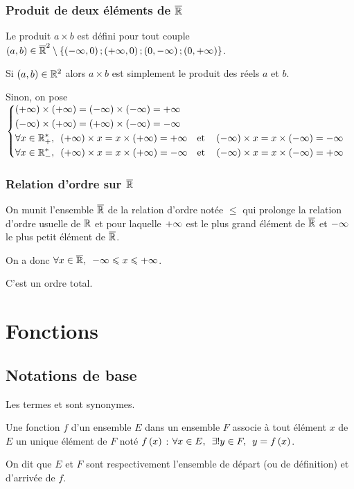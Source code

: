 \subsubsection{Produit de deux éléments de \(\overline{\mathbb{R}}\)}

Le produit \(a\times b\) est défini pour tout couple \(\left(a,b\right)\in\overline{\mathbb{R}}^2\setminus\left\lbrace\left(-\infty,0\right);\left(+\infty,0\right);\left(0,-\infty\right);\left(0,+\infty\right)\right\rbrace\).

Si \(\left(a,b\right)\in\mathbb{R}^2\) alors \(a\times b\) est simplement le produit des réels \(a\) et \(b\).

Sinon, on pose \(\begin{dcases}
\paren{\pinf}\times\paren{\pinf}=\paren{\minf}\times\paren{\minf}=\pinf \\
\paren{\minf}\times\paren{\pinf}=\paren{\pinf}\times\paren{\minf}=\minf \\
\quantifs{\forall x\in\Rps}\paren{\pinf}\times x=x\times\paren{\pinf}=\pinf\quad\text{et}\quad\paren{\minf}\times x=x\times\paren{\minf}=\minf \\
\quantifs{\forall x\in\Rms}\paren{\pinf}\times x=x\times\paren{\pinf}=\minf\quad\text{et}\quad\paren{\minf}\times x=x\times\paren{\minf}=\pinf
\end{dcases}\)

\subsubsection{Relation d'ordre sur \(\overline{\mathbb{R}}\)}

On munit l'ensemble \(\overline{\mathbb{R}}\) de la relation d'ordre notée \(\leq\) qui prolonge la relation d'ordre usuelle de \(\mathbb{R}\) et pour laquelle \(+\infty\) est le plus grand élément de \(\overline{\mathbb{R}}\) et \(-\infty\) le plus petit élément de \(\overline{\mathbb{R}}\).

On a donc \(\quantifs{\forall x\in\Rb}\minf\leq x\leq\pinf\).

C'est un ordre total.

\section{Fonctions}

\subsection{Notations de base}

Les termes  et  sont synonymes.

\begin{defi}
Une fonction \(f\) d'un ensemble \(E\) dans un ensemble \(F\) associe à tout élément \(x\) de \(E\) un unique élément de \(F\) noté \(f\left(x\right)\) : \(\quantifs{\forall x\in E;\exists! y\in F}y=f\paren{x}\).

On dit que \(E\) et \(F\) sont respectivement l'ensemble de départ (ou de définition) et d'arrivée de \(f\).
\end{defi}

